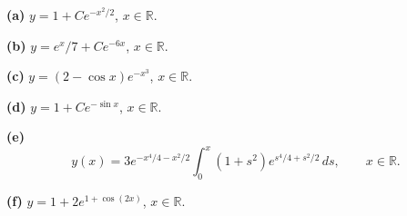 \noindent\textbf{(a)} $y=1+Ce^{-x^2/2}$, $x\in\mathbb R$.

\noindent\textbf{(b)} $y=e^x/7+Ce^{-6x}$, $x\in\mathbb R$.

\noindent\textbf{(c)} $y=(2-\cos x)e^{-x^3}$, $x\in\mathbb R$.

\noindent\textbf{(d)} $y=1+Ce^{-\sin x}$, $x\in\mathbb R$.

\noindent\textbf{(e)} \[y(x)=3e^{-x^4/4-x^2/2}\int_0^x(1+s^2)e^{s^4/4+s^2/2}\,ds,\qquad x\in\mathbb R.\]

\noindent\textbf{(f)} $y=1+2e^{1+\cos(2x)}$, $x\in\mathbb R$.
